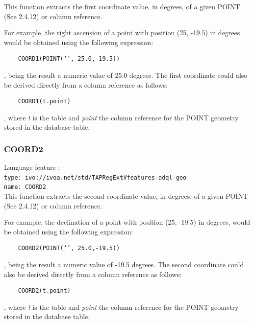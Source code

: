 \documentclass[11pt,a4paper]{ivoa}
\begin{document}
This function extracts the first coordinate value, in degrees, of a given
POINT (See 2.4.12) or column reference.

For example, the right ascension of a point with position (25, -19.5) in
degrees would be obtained using the following expression:

\begin{verbatim}
    COORD1(POINT(‘’, 25.0,-19.5))
\end{verbatim}

, being the result a numeric value of 25.0 degrees. The first coordinate
could also be derived directly from a column reference as follows:

\begin{verbatim}
    COORD1(t.point)
\end{verbatim}
    
, where \textit{t} is the table and \textit{point} the column reference for
the POINT geometry stored in the database table.

\subsubsection{COORD2}
\label{sec:geom.functions.coord2}
{\footnotesize Language feature :}\\
{\footnotesize \verb|type: ivo://ivoa.net/std/TAPRegExt#features-adql-geo|}\\
{\footnotesize \verb|name: COORD2|}\\

This function extracts the second coordinate value, in degrees, of a given
POINT (See 2.4.12) or column reference.

For example, the declination of a point with position (25, -19.5) in degrees,
would be obtained using the following expression:

\begin{verbatim}
    COORD2(POINT(‘’, 25.0,-19.5))
\end{verbatim}

, being the result a numeric value of -19.5 degrees. The second coordinate
could also be derived directly from a column reference as follows:

\begin{verbatim}
    COORD2(t.point)
\end{verbatim}

, where \textit{t} is the table and \textit{point} the column reference for
the POINT geometry stored in the database table.
\end{document}
